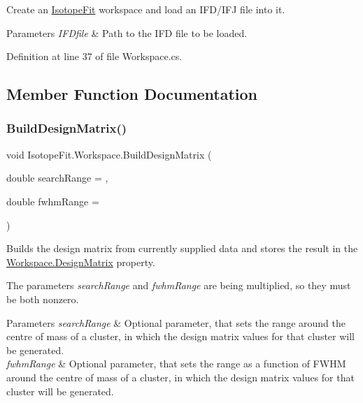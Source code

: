 Create an \hyperlink{namespace_isotope_fit}{Isotope\+Fit} workspace and load an I\+F\+D/\+I\+FJ file into it. 


\begin{DoxyParams}{Parameters}
{\em I\+F\+Dfile} & Path to the I\+FD file to be loaded.\\
\hline
\end{DoxyParams}


Definition at line 37 of file Workspace.\+cs.



\subsection{Member Function Documentation}
\mbox{\label{class_isotope_fit_1_1_workspace_a760f024c67d57242c40c558298bd1878}} 
\subsubsection{\texorpdfstring{Build\+Design\+Matrix()}{BuildDesignMatrix()}}
{\footnotesize\ttfamily void Isotope\+Fit.\+Workspace.\+Build\+Design\+Matrix (\begin{DoxyParamCaption}\item[{double}]{search\+Range = {},  }\item[{double}]{fwhm\+Range = {} }\end{DoxyParamCaption})}



Builds the design matrix from currently supplied data and stores the result in the \hyperlink{class_isotope_fit_1_1_workspace_ae24a2ee8f965fb2ed7ad3a592163271d}{Workspace.\+Design\+Matrix} property. 

The parameters {\itshape search\+Range}  and {\itshape fwhm\+Range}  are being multiplied, so they must be both nonzero.


\begin{DoxyParams}{Parameters}
{\em search\+Range} & Optional parameter, that sets the range around the centre of mass of a cluster, in which the design matrix values for that cluster will be generated.\\
\hline
{\em fwhm\+Range} & Optional parameter, that sets the range as a function of F\+W\+HM around the centre of mass of a cluster, in which the design matrix values for that cluster will be generated.\\
\hline
\end{DoxyParams}


